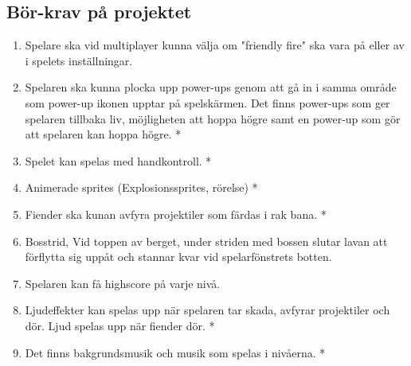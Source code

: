 \documentclass{TDP005mall}
\begin{document}
\subsection{Bör-krav på projektet}
\begin{enumerate}
\item Spelare ska vid multiplayer kunna välja om "friendly fire" ska vara på eller av i spelets inställningar. 
\item Spelaren ska kunna plocka upp power-ups genom att gå in i samma område som power-up ikonen upptar på spelskärmen. Det finns power-ups som ger spelaren tillbaka liv, möjligheten att hoppa högre samt en power-up som gör att spelaren kan hoppa högre. *
\item Spelet kan spelas med handkontroll. *
\item Animerade sprites (Explosionssprites, rörelse) *
\item Fiender ska kunan avfyra projektiler som färdas i rak bana. *
\item Bosstrid, Vid toppen av berget, under striden med bossen slutar lavan att förflytta sig uppåt och stannar kvar vid spelarfönstrets botten.
\item Spelaren kan få highscore på varje nivå.
\item Ljudeffekter kan spelas upp när spelaren tar skada, avfyrar projektiler och dör. Ljud spelas upp när fiender dör. *
\item Det finns bakgrundsmusik och musik som spelas i nivåerna. *
\end{enumerate}
\end{document}

